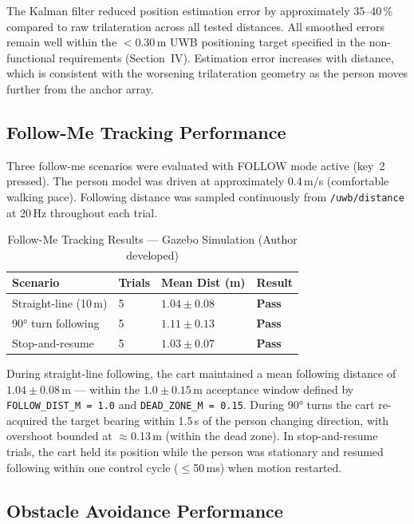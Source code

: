 The Kalman filter reduced position estimation error by approximately
35--40\,\% compared to raw trilateration across all tested distances.
All smoothed errors remain well within the $<$0.30\,m UWB positioning
target specified in the non-functional requirements (Section~IV).
Estimation error increases with distance, which is consistent with
the worsening trilateration geometry as the person moves further
from the anchor array.

\subsection{Follow-Me Tracking Performance}

Three follow-me scenarios were evaluated with FOLLOW mode active
(key~2 pressed). The person model was driven at approximately
0.4\,m/s (comfortable walking pace). Following distance was sampled
continuously from \texttt{/uwb/distance} at 20\,Hz throughout each
trial.

\begin{table}[!ht]
\caption{Follow-Me Tracking Results --- Gazebo Simulation
         (Author developed)}
\label{tab:results_followme}
\centering
\footnotesize
\begin{tabular}{p{2.2cm} p{0.8cm} p{1.5cm} p{1.4cm}}
\toprule
\textbf{Scenario} & \textbf{Trials} &
\textbf{Mean Dist (m)} & \textbf{Result} \\
\midrule
Straight-line (10\,m) & 5 & $1.04 \pm 0.08$ & \textbf{Pass} \\
90° turn following    & 5 & $1.11 \pm 0.13$ & \textbf{Pass} \\
Stop-and-resume       & 5 & $1.03 \pm 0.07$ & \textbf{Pass} \\
\bottomrule
\end{tabular}
\end{table}

During straight-line following, the cart maintained a mean following
distance of $1.04 \pm 0.08$\,m --- within the $1.0 \pm 0.15$\,m
acceptance window defined by \texttt{FOLLOW\_DIST\_M = 1.0} and
\texttt{DEAD\_ZONE\_M = 0.15}. During 90° turns the cart re-acquired
the target bearing within 1.5\,s of the person changing direction,
with overshoot bounded at $\approx$0.13\,m (within the dead zone).
In stop-and-resume trials, the cart held its position while the person
was stationary and resumed following within one control cycle
($\leq$50\,ms) when motion restarted.

\subsection{Obstacle Avoidance Performance}

